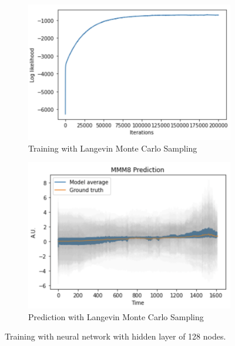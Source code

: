 \documentclass{article}
\begin{document}
\begin{figure}[h]
    \begin{subfigure}[b]{0.5\textwidth}
        \centering
        \includegraphics[width=\textwidth]{../img/training_Langevin_200000_128.png}
        \caption{Training with Langevin Monte Carlo Sampling}
    \end{subfigure}\hfill
    \begin{subfigure}[b]{0.5\textwidth}
        \centering
        \includegraphics[trim={0 0 0 0.7cm}, clip, width=\textwidth]{../img/prediction_Langevin_200000_128.png}
        \caption{Prediction with Langevin Monte Carlo Sampling}
    \end{subfigure}
    \caption{Training with neural network with hidden layer of 128 nodes.}
\end{figure}
\end{document}
